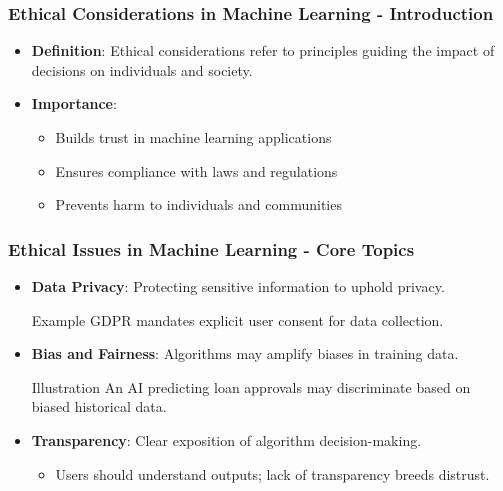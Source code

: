\documentclass[aspectratio=169]{beamer}
\begin{document}
\begin{frame}[fragile]
    \frametitle{Ethical Considerations in Machine Learning - Introduction}
    \begin{itemize}
        \item \textbf{Definition}: Ethical considerations refer to principles guiding the impact of decisions on individuals and society.
        \item \textbf{Importance}: 
        \begin{itemize}
            \item Builds trust in machine learning applications
            \item Ensures compliance with laws and regulations
            \item Prevents harm to individuals and communities
        \end{itemize}
    \end{itemize}
\end{frame}

\begin{frame}[fragile]
    \frametitle{Ethical Issues in Machine Learning - Core Topics}
    \begin{itemize}
        \item \textbf{Data Privacy}: Protecting sensitive information to uphold privacy.
            \begin{block}{Example}
                GDPR mandates explicit user consent for data collection.
            \end{block}

        \item \textbf{Bias and Fairness}: Algorithms may amplify biases in training data.
            \begin{block}{Illustration}
                An AI predicting loan approvals may discriminate based on biased historical data.
            \end{block}

        \item \textbf{Transparency}: Clear exposition of algorithm decision-making.
            \begin{itemize}
                \item Users should understand outputs; lack of transparency breeds distrust.
            \end{itemize}
    \end{itemize}
\end{frame}
\end{document}
